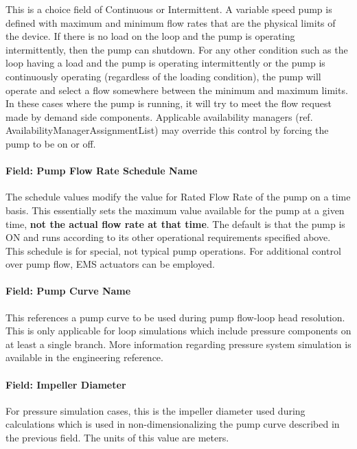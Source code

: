 This is a choice field of Continuous or Intermittent. A variable speed pump is defined with maximum and minimum flow rates that are the physical limits of the device. If there is no load on the loop and the pump is operating intermittently, then the pump can shutdown. For any other condition such as the loop having a load and the pump is operating intermittently or the pump is continuously operating (regardless of the loading condition), the pump will operate and select a flow somewhere between the minimum and maximum limits. In these cases where the pump is running, it will try to meet the flow request made by demand side components. Applicable availability managers (ref. AvailabilityManagerAssignmentList) may override this control by forcing the pump to be on or off.

\paragraph{Field: Pump Flow Rate Schedule Name}\label{field-pump-flow-rate-schedule-name-000}

The schedule values modify the value for Rated Flow Rate of the pump on a time basis. This essentially sets the maximum value available for the pump at a given time, \textbf{not the actual flow rate at that time}. The default is that the pump is ON and runs according to its other operational requirements specified above. This schedule is for special, not typical pump operations. For additional control over pump flow, EMS actuators can be employed.

\paragraph{Field: Pump Curve Name}\label{field-pump-curve-name}

This references a pump curve to be used during pump flow-loop head resolution. This is only applicable for loop simulations which include pressure components on at least a single branch. More information regarding pressure system simulation is available in the engineering reference.

\paragraph{Field: Impeller Diameter}\label{field-impeller-diameter}

For pressure simulation cases, this is the impeller diameter used during calculations which is used in non-dimensionalizing the pump curve described in the previous field. The units of this value are meters.

